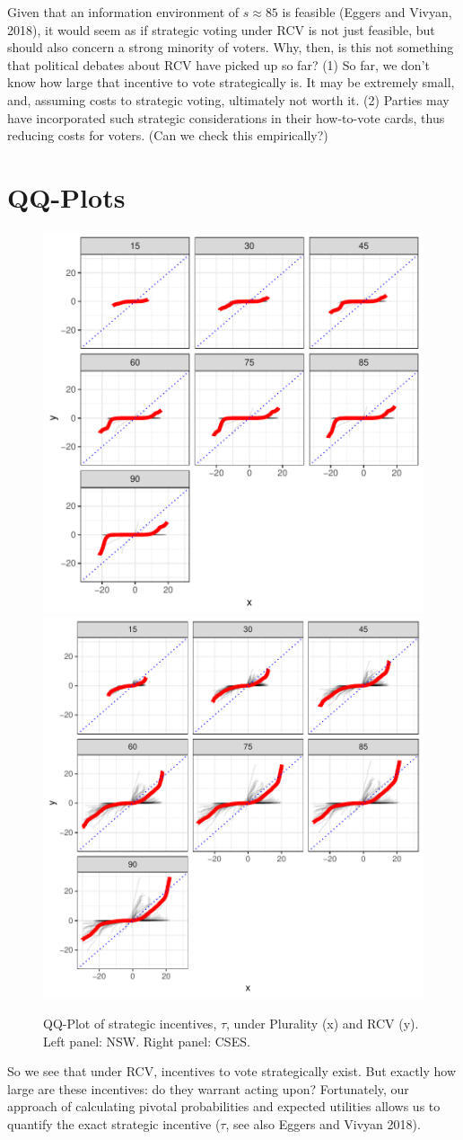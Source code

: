 \documentclass[11pt, letter, margin = 2 in]{article}
\begin{document}
Given that an information environment of $s \approx 85$ is feasible (Eggers and Vivyan, 2018), it would seem as if strategic voting under RCV is not just feasible, but should also concern a strong minority of voters. Why, then, is this not something that political debates about RCV have picked up so far? (1) So far, we don't know how large that incentive to vote strategically is. It may be extremely small, and, assuming costs to strategic voting, ultimately not worth it. (2) Parties may have incorporated such strategic considerations in their how-to-vote cards, thus reducing costs for voters. (Can we check this empirically?)

\section{QQ-Plots}

\begin{figure}[!h]
	\centering
	\includegraphics[width = .45 \textwidth]{"../output/figures/australia_sv_qq"}
	\includegraphics[width = .45 \textwidth]{"../output/figures/cses_qq"}
	\caption{QQ-Plot of strategic incentives, $\tau$, under Plurality (x) and RCV (y). Left panel: NSW. Right panel: CSES.}
	\label{fig:qqplots}
\end{figure}

So we see that under RCV, incentives to vote strategically exist. But exactly how large are these incentives: do they warrant acting upon? Fortunately, our approach of calculating pivotal probabilities and expected utilities allows us to quantify the exact strategic incentive ($\tau$, see also Eggers and Vivyan 2018). 
\end{document}
